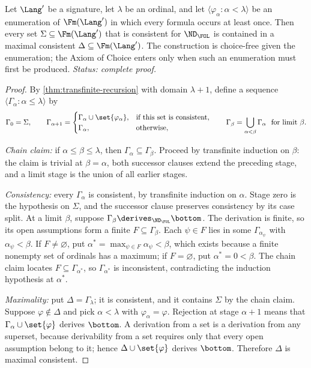 \begin{lemma}
\label{lem:transfinite-lindenbaum}
Let \(\Lang'\) be a signature, let \(\lambda\) be an ordinal, and let
\(\langle\varphi_\alpha:\alpha<\lambda\rangle\) be an enumeration of
\(\Fm(\Lang')\) in which every formula occurs at least once.  Then every
set \(\Sigma\subseteq\Fm(\Lang')\) that is consistent for
\(\ND_{\FOL}\) is contained in a maximal consistent
\(\Delta\subseteq\Fm(\Lang')\).  The construction is choice-free given the
enumeration; the Axiom of Choice enters only when such an enumeration must
first be produced.
\textit{Status: complete proof.}
\end{lemma}
\begin{proof}
By \cref{thm:transfinite-recursion} with domain \(\lambda+1\), define a
sequence \(\langle\Gamma_\alpha:\alpha\le\lambda\rangle\) by
\[
 \Gamma_0=\Sigma,\qquad
 \Gamma_{\alpha+1}=
 \begin{cases}
   \Gamma_\alpha\cup\set{\varphi_\alpha},&\text{if this set is
     consistent},\\
   \Gamma_\alpha,&\text{otherwise},
 \end{cases}
 \qquad
 \Gamma_\beta=\bigcup_{\alpha<\beta}\Gamma_\alpha
 \ \text{ for limit }\beta.
\]

\emph{Chain claim:} if \(\alpha\le\beta\le\lambda\), then
\(\Gamma_\alpha\subseteq\Gamma_\beta\).  Proceed by transfinite induction
on \(\beta\): the claim is trivial at \(\beta=\alpha\), both successor
clauses extend the preceding stage, and a limit stage is the union of all
earlier stages.

\emph{Consistency:} every \(\Gamma_\alpha\) is consistent, by transfinite
induction on \(\alpha\).  Stage zero is the hypothesis on \(\Sigma\), and
the successor clause preserves consistency by its case split.  At a limit
\(\beta\), suppose \(\Gamma_\beta\derives_{\ND_{\FOL}}\bottom\).  The
derivation is finite, so its open assumptions form a finite
\(F\subseteq\Gamma_\beta\).  Each \(\psi\in F\) lies in some
\(\Gamma_{\alpha_\psi}\) with \(\alpha_\psi<\beta\).  If
\(F\ne\varnothing\), put
\(\alpha^{*}=\max_{\psi\in F}\alpha_\psi<\beta\), which exists because a
finite nonempty set of ordinals has a maximum; if \(F=\varnothing\), put
\(\alpha^{*}=0<\beta\).  The chain claim locates
\(F\subseteq\Gamma_{\alpha^{*}}\), so \(\Gamma_{\alpha^{*}}\) is
inconsistent, contradicting the induction hypothesis at \(\alpha^{*}\).

\emph{Maximality:} put \(\Delta=\Gamma_\lambda\); it is consistent, and it
contains \(\Sigma\) by the chain claim.  Suppose \(\varphi\notin\Delta\)
and pick \(\alpha<\lambda\) with \(\varphi_\alpha=\varphi\).  Rejection at
stage \(\alpha+1\) means that \(\Gamma_\alpha\cup\set{\varphi}\) derives
\(\bottom\).  A derivation from a set is a derivation from any superset,
because derivability from a set requires only that every open assumption
belong to it; hence \(\Delta\cup\set{\varphi}\) derives \(\bottom\).
Therefore \(\Delta\) is maximal consistent.
\end{proof}

